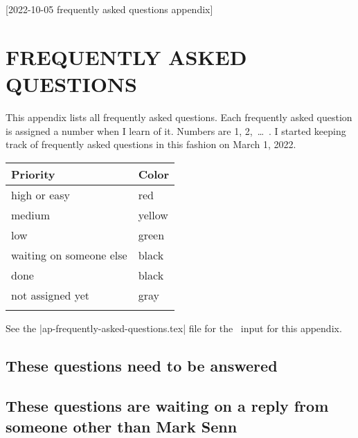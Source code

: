[2022-10-05 frequently asked questions appendix]

\newcommand{\MyA}{\textbf{A: }}

\makeatletter
\newcommand{\faq}[2]
  {%
    \vspace{6pt}
    \noindent
    {%
      \bfseries
      \ifthen{\equal{high}{#2}}{\color{red}}%
      \ifthen{\equal{medium}{#2}}{\color{yellow}}%
      \ifthen{\equal{low}{#2}}{\color{green}}%
      \ifthen{\equal{done}{#2}}{\color{black}}%
      \ifthen{\equal{fixed}{#2}}{\color{black}}%
      \ifthen{\equal{wait}{#2}}{\color{black}}%
      \ifthen{\equal{not}{#2}}{\color{gray}}%
      {\fontsize{9}{10}\reset@font\bf FAQ}
      #1.
    }%
    \ignorespaces
  }
\makeatother
  
\chapter{FREQUENTLY ASKED QUESTIONS}

This appendix lists all frequently asked questions.
Each frequently asked question is assigned a number when I learn of it.
Numbers are 1, 2,~\ldots~.
I started keeping track
of frequently asked questions
in this fashion
on March 1, 2022.

\begin{tabular}{@{}ll@{}}
  \toprule
  \bf Priority& \bf Color\\
  \midrule
  high or easy& \color{red}red\\
  medium& \color{yellow}yellow\\
  low& \color{green}green\\
  waiting on someone else& \color{black}black\\
  done& \color{black}black\\
  not assigned yet& \color{gray}gray\\
  \bottomrule\\
\end{tabular}

See the
|ap-frequently-asked-questions.tex|
file
for the \LaTeXLogo\ input
for this appendix.


\section{These questions need to be answered}


\section{These questions are waiting on a reply from someone other than Mark Senn}


